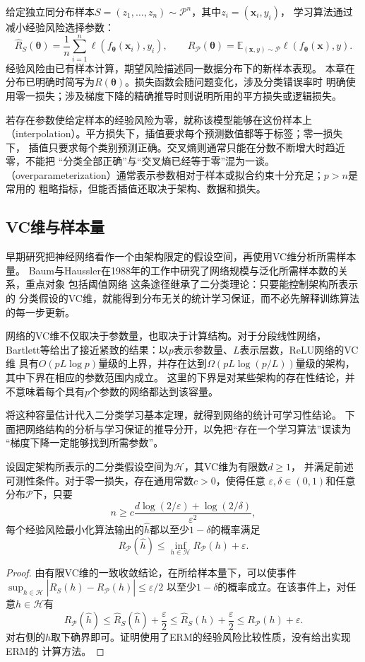 给定独立同分布样本$S=(z_1,\ldots,z_n)\sim\mathcal P^n$，其中$z_i=(\bm x_i,y_i)$，
学习算法通过减小经验风险选择参数：
\[
 \hat R_S(\bm\theta)=\frac1n\sum_{i=1}^n\ell(f_{\bm\theta}(\bm x_i),y_i),
 \qquad
 R_{\mathcal P}(\bm\theta)=\mathbb E_{(\bm x,y)\sim\mathcal P}
 \ell(f_{\bm\theta}(\bm x),y).
\]
经验风险由已有样本计算，期望风险描述同一数据分布下的新样本表现。
本章在分布已明确时简写为$R(\bm\theta)$。损失函数会随问题变化，涉及分类错误率时
明确使用零一损失；涉及梯度下降的精确推导时则说明所用的平方损失或逻辑损失。

若存在参数使给定样本的经验风险为零，就称该模型能够在这份样本上
（interpolation）。平方损失下，插值要求每个预测数值都等于标签；零一损失下，
插值只要求每个类别预测正确。交叉熵则通常只能在分数不断增大时趋近零，不能把
“分类全部正确”与“交叉熵已经等于零”混为一谈。
（overparameterization）通常表示参数相对于样本或拟合约束十分充足；$p>n$是常用的
粗略指标，但能否插值还取决于架构、数据和损失。

\subsection{VC维与样本量}

早期研究把神经网络看作一个由架构限定的假设空间，再使用VC维分析所需样本量。
Baum与Haussler在1988年的工作中研究了网络规模与泛化所需样本数的关系，重点对象
包括阈值网络 这条途径继承了二分类理论：只要能控制架构所表示的
分类假设的VC维，就能得到分布无关的统计学习保证，而不必先解释训练算法的每一步更新。

网络的VC维不仅取决于参数量，也取决于计算结构。对于分段线性网络，
Bartlett等给出了接近紧致的结果：以$p$表示参数量、$L$表示层数，ReLU网络的VC维
具有$O(pL\log p)$量级的上界，并存在达到$\Omega(pL\log(p/L))$量级的架构，
其中下界在相应的参数范围内成立。
这里的下界是对某些架构的存在性结论，并不意味着每个具有$p$个参数的网络都达到该容量。

将这种容量估计代入二分类学习基本定理，就得到网络的统计可学习性结论。
下面把网络结构的分析与学习保证的推导分开，以免把“存在一个学习算法”误读为
“梯度下降一定能够找到所需参数”。

\begin{theorem}[有限VC维网络的不可知PAC样本量保证]
\label{thm:network-vc-pac}
设固定架构所表示的二分类假设空间为$\mathcal H$，其VC维为有限数$d\geq1$，
并满足前述可测性条件。对于零一损失，存在通用常数$c>0$，使得任意
$\varepsilon,\delta\in(0,1)$和任意分布$\mathcal P$下，只要
\[
 n\geq c\frac{d\log(2/\varepsilon)+\log(2/\delta)}{\varepsilon^2},
\]
每个经验风险最小化算法输出的$\hat h$都以至少$1-\delta$的概率满足
\[
 R_{\mathcal P}(\hat h)\leq\inf_{h\in\mathcal H}R_{\mathcal P}(h)+\varepsilon.
\]
\end{theorem}
\begin{proof}
由有限VC维的一致收敛结论，在所给样本量下，可以使事件
$\sup_{h\in\mathcal H}|\hat R_S(h)-R_{\mathcal P}(h)|\leq\varepsilon/2$
以至少$1-\delta$的概率成立。在该事件上，对任意$h\in\mathcal H$有
\[
 R_{\mathcal P}(\hat h)
 \leq\hat R_S(\hat h)+\frac\varepsilon2
 \leq\hat R_S(h)+\frac\varepsilon2
 \leq R_{\mathcal P}(h)+\varepsilon.
\]
对右侧的$h$取下确界即可。证明使用了ERM的经验风险比较性质，没有给出实现ERM的
计算方法。
\end{proof}

